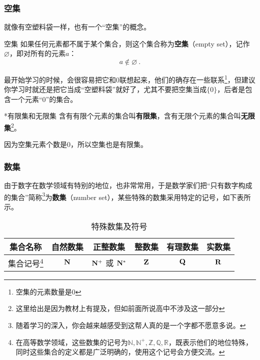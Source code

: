 \subsubsection{空集}

就像有空塑料袋一样，也有一个“空集”的概念。

\begin{definition}{空集}
如果任何元素都不属于某个集合，则这个集合称为\textbf{空集}（empty set），记作 $\varnothing$，即对所有的元素$a$：
\begin{equation}
a\notin\varnothing~.
\end{equation}
\end{definition}

最开始学习的时候，会很容易把它和$0$联想起来，他们的确存在一些联系\footnote{空集的元素数量是0}，但建议你学习时就还是把它当成“空塑料袋”就好了，尤其不要把空集当成$\{0\}$，后者是包含一个元素“$0$”的集合。

\begin{definition}{*有限集和无限集}
含有有限个元素的集合叫\textbf{有限集}，含有无限个元素的集合叫\textbf{无限集}\footnote{这里给出是因为教材上有提及，但如前面所说高中不涉及这一部分}。
\end{definition}

因为空集元素个数是0，所以空集也是有限集。

\subsubsection{数集}

由于数字在数学领域有特别的地位，也非常常用，于是数学家们把“只有数字构成的集合”简称\footnote{随着学习的深入，你会越来越感受到这帮人真的是一个字都不愿意多说。}为\textbf{数集}（number set），某些特殊的数集采用特定的记号，如下表所示。

\begin{table}[ht]
\centering
\caption{特殊数集及符号}\label{tab_HsSet2}
\begin{tabular}{|c|c|c|c|c|c|}
\hline
集合名称 &自然数集  &正整数集  & 整数集 & 有理数集& 实数集 \\
\hline
集合记号\footnote{在高等数学领域，这些数集的记号为$\mathbb{N,N^+,Z,Q,R}$，既表示他们的地位特殊，同时这些集合的定义都是广泛明确的，使用这个记号会方便交流。} & ${\rm \mathbf{N}}$ & ${\rm \mathbf{N^+}}$ 或 ${\rm \mathbf{N^*}}$ & ${\rm \mathbf{Z}}$ & ${\rm \mathbf{Q}}$ & ${\rm \mathbf{R}}$ \\
\hline
\end{tabular}
\end{table}

